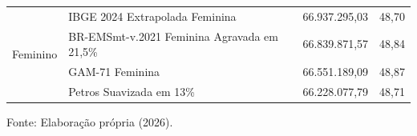 \begin{table}[htbp]
\begin{threeparttable}
\begin{tabular}{llrr}
    \multirow{4}{*}{Feminino} & IBGE 2024 Extrapolada Feminina & 66.937.295,03	 & 48,70 \\
                                & BR-EMSmt-v.2021 Feminina Agravada em 21,5\% & 66.839.871,57 & 48,84 \\
                                & GAM-71 Feminina & 66.551.189,09 & 48,87 \\
                                & Petros Suavizada em 13\% & 66.228.077,79 & 48,71 \\ \bottomrule
    \end{tabular}
    \begin{tablenotes}[flushleft]
        \small
        \item Fonte: Elaboração própria (2026).
    \end{tablenotes}
    \end{threeparttable}
    \label{tab:jovem-ine}
\end{table}
\vspace{0.5cm}
